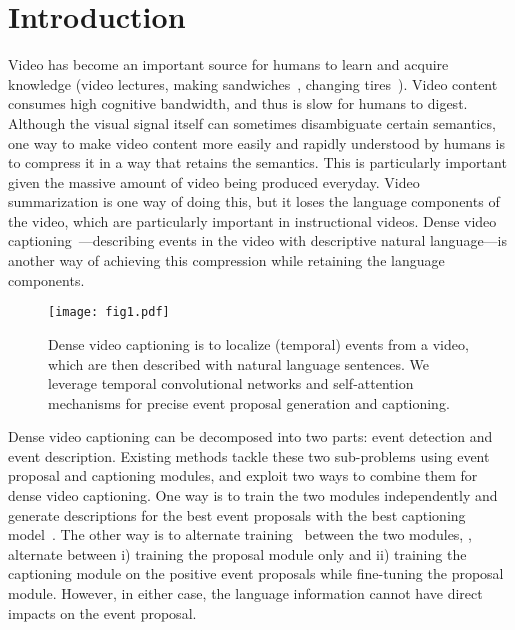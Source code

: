 \documentclass[10pt,twocolumn,letterpaper]{article}
\begin{document}
\section{Introduction}
\label{sec:intro}


Video has become an important source for humans to learn and acquire
knowledge (\eg video lectures, making sandwiches~\cite{kuehne2014language}, changing tires~\cite{alayrac2016learning}).
Video content consumes high cognitive bandwidth, and thus is slow for humans to digest. 
Although the visual signal itself can sometimes disambiguate certain semantics, one way to make video content more easily and rapidly understood by humans is to compress it in a way that retains the semantics.  
This is particularly important given the massive amount of video being produced everyday. 
Video summarization \cite{zhang2016video} is one way of doing this, but it loses the language components of the video, which are particularly important in instructional videos.
Dense video captioning~\cite{krishna2017dense}---describing  events in the video with descriptive natural language---is another way of achieving this compression while retaining the language components.

\begin{figure}[t]
\centering 
   \texttt{[image: fig1.pdf]}
    \vspace{-10pt}
       \caption{Dense video captioning is to localize (temporal) events from a video, which are then described with natural language sentences. We leverage temporal convolutional networks and self-attention mechanisms for precise event proposal generation and captioning.}
    \vspace{-10pt}
\label{fig:fig1}
\end{figure}

Dense video captioning can be decomposed into two parts: event detection and event description. Existing methods tackle these two sub-problems using event proposal and captioning modules, and exploit two ways to combine them for dense video captioning. 
One way is to train the two modules independently and generate descriptions for the best event proposals with the best captioning model~\cite{ghanem2017activitynet}. 
The other way is to alternate training~\cite{krishna2017dense} between the two modules, \ie, alternate between i) training the proposal module only and ii) training the captioning module on the positive event proposals while fine-tuning the proposal module.
However, in either case, the language information cannot have direct impacts on the event proposal. 
\end{document}
